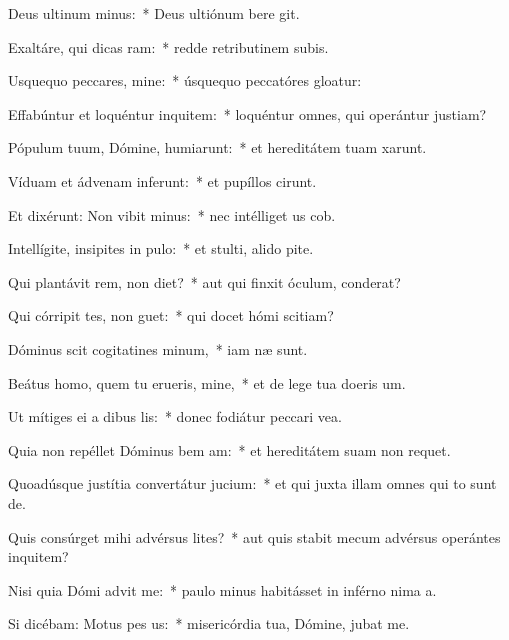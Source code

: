 \item Deus ultinum minus:~* Deus ultiónum bere git.
\item Exaltáre, qui dicas ram:~* redde retributinem subis.
\item Usquequo peccares, mine:~* úsquequo peccatóres gloatur:
\item Effabúntur et loquéntur inquitem:~* loquéntur omnes, qui operántur justiam?
\item Pópulum tuum, Dómine, humiarunt:~* et hereditátem tuam xarunt.
\item Víduam et ádvenam inferunt:~* et pupíllos cirunt.
\item Et dixérunt: Non vibit minus:~* nec intélliget us cob.
\item Intellígite, insipites in pulo:~* et stulti, alido pite.
\item Qui plantávit rem, non diet?~* aut qui finxit óculum,  conderat?
\item Qui córripit tes, non guet:~* qui docet hómi scitiam?
\item Dóminus scit cogitatines minum,~* iam næ sunt.
\item Beátus homo, quem tu erueris, mine,~* et de lege tua doeris um.
\item Ut mítiges ei a dibus lis:~* donec fodiátur peccari vea.
\item Quia non repéllet Dóminus bem am:~* et hereditátem suam non requet.
\item Quoadúsque justítia convertátur  jucium:~* et qui juxta illam omnes qui to sunt de.
\item Quis consúrget mihi advérsus lites?~* aut quis stabit mecum advérsus operántes inquitem?
\item Nisi quia Dómi advit me:~* paulo minus habitásset in inférno nima a.
\item Si dicébam: Motus  pes us:~* misericórdia tua, Dómine, jubat me.
